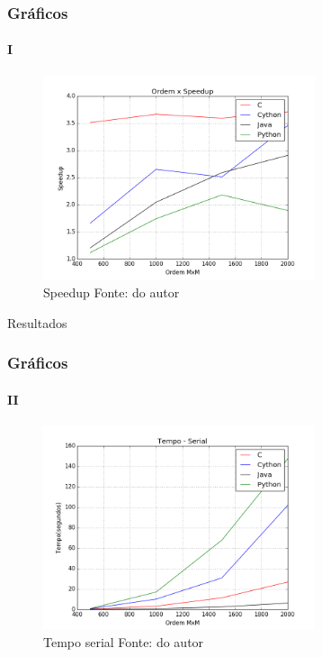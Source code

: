 \documentclass[aspectratio=169]{beamer}
\begin{document}
\begin{frame}
\frametitle{Gráficos}
\framesubtitle{I}

\begin{figure}
  \centering
  \includegraphics[width=8cm]{pictures/speedup_full2.png}
  \caption{Speedup {\small Fonte: do autor}}
\end{figure}

\end{frame}

\begin{frame}{Resultados}
\frametitle{Gráficos}
\framesubtitle{II}

\begin{figure}
  \centering
  \includegraphics[width=8cm]{pictures/tempo_serial.png}
  \caption{Tempo serial {\small Fonte: do autor}}
\end{figure}

\end{frame}
\end{document}
